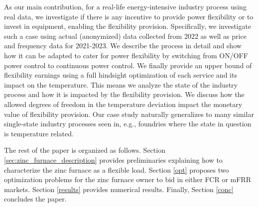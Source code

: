 \documentclass[conference]{IEEEtran}
\begin{document}

As our main contribution, for a real-life energy-intensive industry process using real data, we investigate if there is any incentive to provide power flexibility or to invest in equipment, enabling the flexibility provision.
%
Specifically, we investigate such a case using actual (anonymized) data collected from 2022 as well as price and frequency data for 2021-2023. We describe the process in detail and show how it can be adapted to cater for power flexibility by switching from ON/OFF power control to continuous power control.
We finally provide an upper bound of flexibility earnings using a full hindsight optimization of each service and its impact on the temperature. This means we analyze the state of the industry process and how it is impacted by the flexibility provision. We discuss how the allowed degrees of freedom in the temperature deviation impact the monetary value of flexibility provision.
Our case study naturally generalizes to many similar single-state industry processes seen in, e.g., foundries where the state in question is temperature related.


The rest of the paper is organized as follows. 
Section \ref{sec:zinc_furnace_description} provides preliminaries explaining how to characterize the zinc furnace as a flexible load.
Section \ref{opt} proposes two optimization problems for the zinc furnace owner to bid in either FCR or mFRR markets. Section \ref{results} provides numerical results. Finally, Section \ref{conc} concludes the paper.


\vspace{2mm}
\end{document}
